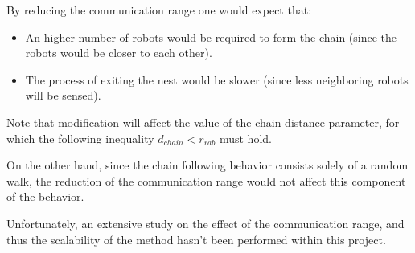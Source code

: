 By reducing the communication range one would expect that:
\begin{itemize}
  \item An higher number of robots would be required to form the 
chain (since the robots would be closer to each other).
\item The process of exiting the nest would be slower (since less neighboring robots will be sensed).
\end{itemize}
Note that modification will affect the value of the chain distance parameter, for which the following inequality $d_{chain} < r_{rab}$ must hold. 

On the other hand, since the chain following behavior consists solely of a random walk, the reduction of the communication range would not affect this component of the behavior.

Unfortunately, an extensive study on the effect of the communication range, and thus the scalability of the method hasn't been performed within this project.

